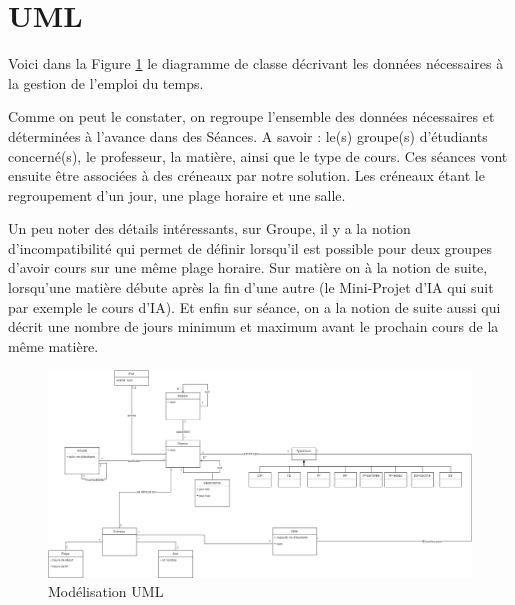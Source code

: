 \section{UML}

Voici dans la Figure \ref{fig:uml} le diagramme de classe décrivant les données
nécessaires à la gestion de l'emploi du temps.

Comme on peut le constater, on regroupe l'ensemble des données nécessaires et
déterminées à l'avance dans des Séances. A savoir : le(s) groupe(s) d'étudiants
concerné(s), le professeur, la matière, ainsi que le type de cours.
Ces séances vont ensuite être associées à des créneaux par notre solution.
Les créneaux étant le regroupement d'un jour, une plage horaire et une salle.

Un peu noter des détails intéressants, sur Groupe, il y a la notion
d'incompatibilité qui permet de définir lorsqu'il est possible pour deux groupes
d'avoir cours sur une même plage horaire. Sur matière on à la notion de suite,
lorsqu'une matière débute après la fin d'une autre (le Mini-Projet d'IA qui suit
par exemple le cours d'IA).
Et enfin sur séance, on a la notion de suite aussi qui décrit une nombre de
jours minimum et maximum avant le prochain cours de la même matière.

\begin{landscape}

    \begin{figure}[t]
        \includegraphics[keepaspectratio=true,width=26cm]{diagrammeClasse.png}
            \caption{\label{fig:uml} Modélisation UML}
    \end{figure}

\end{landscape}
